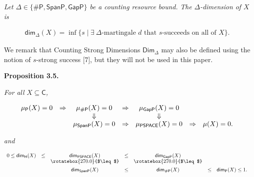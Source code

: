 \emph{Let $\Delta\in\{{\mathsf{\#}\mathsf{P}},\mathsf{SpanP},\mathsf{GapP}\}$ be a counting resource bound.
The $\Delta$-dimension of $X$ is}\par


\[\begin{gathered}
{\mathsf{dim}}_{\Delta}(X)=\inf\{s\mid\exists\ \Delta\textrm{-martingale $d$ that $s$-succeeds on all of $X$}\}.
\end{gathered}\]






We remark that Counting Strong Dimensions ${\mathsf{Dim}}_{\Delta}$ may also be defined using the notion of $s$-strong success [7], but they will not be used in this paper.\par





\par\medskip\noindent\textbf{
\textbf{Proposition 3.5}\textbf{.}
}\par



\emph{For all $X\subseteq\mathsf{C}$,}\par


\[\begin{gathered}
\begin{array}[]{ccccccc}\mu_{\mathsf{P}}(X)=0&\Rightarrow&\mu_{{\mathsf{\#}\mathsf{P}}}(X)=0&\Rightarrow&\mu_{\mathsf{GapP}}(X)=0\\
&&\Downarrow&&\Downarrow\\
&&\mu_{\mathsf{SpanP}}(X)=0&\Rightarrow&\mu_{\mathsf{PSPACE}}(X)=0&\Rightarrow&\mu(X)=0.\end{array}
\end{gathered}\]


\emph{and}\par


\[\begin{gathered}
\begin{array}[]{ccccccc}0\leq{\mathsf{dim}}_{\mathsf{H}}(X)&\leq&{\mathsf{dim}}_{\mathsf{PSPACE}}(X)&\leq&{\mathsf{dim}}_{\mathsf{GapP}}(X)\\
&&\mathrel{\raisebox{4.30554pt}{\rotatebox{270.0}{$\leq$}}}&&\mathrel{\raisebox{4.30554pt}{\rotatebox{270.0}{$\leq$}}}\\
&&{\mathsf{dim}}_{\mathsf{SpanP}}(X)&\leq&{\mathsf{dim}}_{\mathsf{\#}\mathsf{P}}(X)&\leq&{\mathsf{dim}}_{\mathsf{P}}(X)\leq 1.\end{array}
\end{gathered}\]



